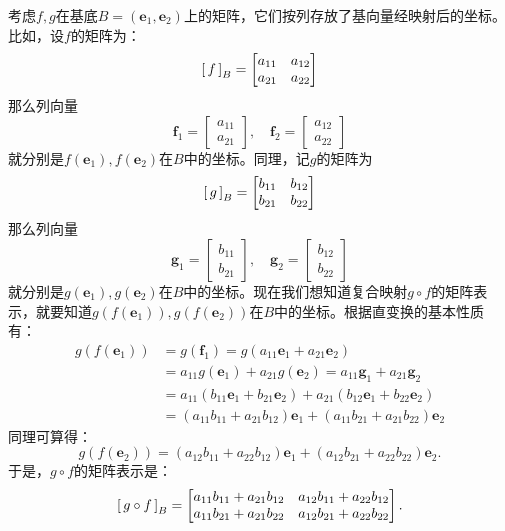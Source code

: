 \documentclass[12pt,UTF8,fontset=none]{ctexbook}
\begin{document}
考虑$f,g$在基底$B = (\mathbf{e}_1,\mathbf{e}_2)$上的矩阵，它们按列存放了基向量经映射后的坐标。比如，设$f$的矩阵为： 
$$
    \bmat{f}[B] = 
    \begin{bmatrix}
        a_{11} & a_{12} \\ a_{21} & a_{22}
    \end{bmatrix}
$$
那么列向量
$$
    \mathbf{f}_1 = \begin{bmatrix}
        a_{11} \\ a_{21} 
    \end{bmatrix},\quad
    \mathbf{f}_2 = \begin{bmatrix}
        a_{12} \\ a_{22}
    \end{bmatrix}
$$
就分别是$f(\mathbf{e}_1),f(\mathbf{e}_2)$在$B$中的坐标。同理，记$g$的矩阵为
$$
    \bmat{g}[B] = 
    \begin{bmatrix}
        b_{11} & b_{12} \\ b_{21} & b_{22}
    \end{bmatrix}
$$
那么列向量
$$
    \mathbf{g}_1 = \begin{bmatrix}
        b_{11} \\ b_{21} 
    \end{bmatrix},\quad
    \mathbf{g}_2 = \begin{bmatrix}
        b_{12} \\ b_{22}
    \end{bmatrix}
$$
就分别是$g(\mathbf{e}_1),g(\mathbf{e}_2)$在$B$中的坐标。现在我们想知道复合映射$g\circ f$的矩阵表示，就要知道$g(f(\mathbf{e}_1)),g(f(\mathbf{e}_2))$在$B$中的坐标。根据直变换的基本性质有：
\begin{align*}
    g(f(\mathbf{e}_1)) &= g(\mathbf{f}_1) = g(a_{11}\mathbf{e}_1 + a_{21}\mathbf{e}_2)\\
    &= a_{11}g(\mathbf{e}_1) + a_{21}g(\mathbf{e}_2) = a_{11} \mathbf{g}_1 + a_{21}\mathbf{g}_2 \\
    &= a_{11}(b_{11}\mathbf{e}_1 + b_{21}\mathbf{e}_2) + a_{21}(b_{12}\mathbf{e}_1 + b_{22}\mathbf{e}_2) \\
    &= (a_{11}b_{11} + a_{21}b_{12})\mathbf{e}_1 + (a_{11}b_{21} + a_{21}b_{22})\mathbf{e}_2
\end{align*}
同理可算得：
$$
g(f(\mathbf{e}_2)) = (a_{12}b_{11} + a_{22}b_{12})\mathbf{e}_1 + (a_{12}b_{21} + a_{22}b_{22})\mathbf{e}_2.
$$
于是，$g\circ f$的矩阵表示是：
$$
    \bmat{g\circ f}[B] = 
    \begin{bmatrix}
        a_{11}b_{11} + a_{21}b_{12} & a_{12}b_{11} + a_{22}b_{12} \\ a_{11}b_{21} + a_{21}b_{22} & a_{12}b_{21} + a_{22}b_{22}
    \end{bmatrix}.
$$
\end{document}
